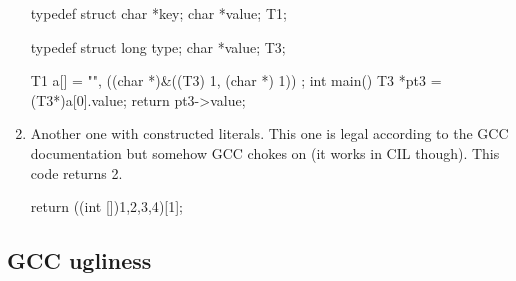 \documentclass{article}
\begin{document}
\begin{enumerate}
\begin{cilcode}[global]
typedef struct
{
  char *key;
  char *value;
} T1;

typedef struct
{
  long type;
  char *value;
} T3;

T1 a[] =
{
  {
    "",
    ((char *)&((T3) {1, (char *) 1}))
  }
};
int main() {
   T3 *pt3 = (T3*)a[0].value;
   return pt3->value;
}
\end{cilcode}

\item Another one with constructed literals. This one is legal according to
the GCC documentation but somehow GCC chokes on (it works in CIL though). This
code returns 2.

\begin{cilcode}[local]
 return ((int []){1,2,3,4})[1];
\end{cilcode}

\end{enumerate}

 \subsection{GCC ugliness}\label{sec-ugly-gcc}
\end{document}

